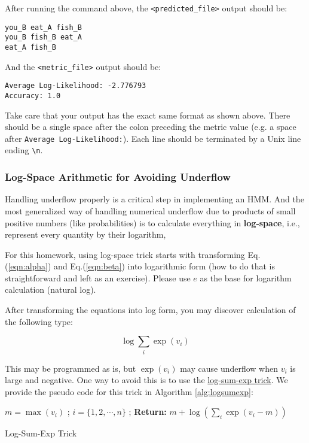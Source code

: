 \documentclass[11pt,addpoints,answers]{exam}
\numberwithin{equation}{section} %
\numberwithin{figure}{section} %
\numberwithin{table}{section} %
\begin{document}
After running the command above, the \texttt{<predicted\_file>} output should be:

\begin{lstlisting}
you_B eat_A fish_B
you_B fish_B eat_A
eat_A fish_B
\end{lstlisting}

And the \texttt{<metric\_file>} output should be:

\begin{lstlisting}
Average Log-Likelihood: -2.776793
Accuracy: 1.0
\end{lstlisting}

Take care that your output has the exact same format as shown above. There should be a single space after the colon preceding the metric value (e.g. a space after \lstinline{Average Log-Likelihood:}). Each line should be terminated by a Unix line ending \lstinline{\n}.



\subsubsection{Log-Space Arithmetic for Avoiding Underflow}
\label{sec:underflow}

Handling underflow properly is a critical step in implementing an HMM. And the most generalized way of handling numerical underflow due to products of small positive numbers (like probabilities) is to calculate everything in \textbf{log-space}, i.e., represent every quantity by their logarithm, 

For this homework, using log-space trick starts with transforming Eq.(\ref{eqn:alpha}) and Eq.(\ref{eqn:beta}) into logarithmic form (how to do that is straightforward and left as an exercise). Please use $e$ as the base for logarithm calculation (natural log).

After transforming the equations into log form, you may discover calculation of the following type:

$$ \log \sum_i \exp{(v_i)}$$

This may be programmed as is, but $\exp{(v_i)}$ may cause underflow when $v_i$ is large and negative. One way to avoid this is to use the \href{https://www.xarg.org/2016/06/the-log-sum-exp-trick-in-machine-learning/}{log-sum-exp trick}. We provide the pseudo code for this trick in Algorithm \ref{alg:logsumexp}:

\begin{algorithm}[H] 
 \label{alg:logsumexp}
 $m = \max(v_i)$ ; \;
 $i=\{1, 2,\cdots, n\}$ ; \;
 \textbf{Return: }{$m + \log(\sum_i\exp(v_i-m))$} 
 \caption{Log-Sum-Exp Trick}
\end{algorithm}
\end{document}
